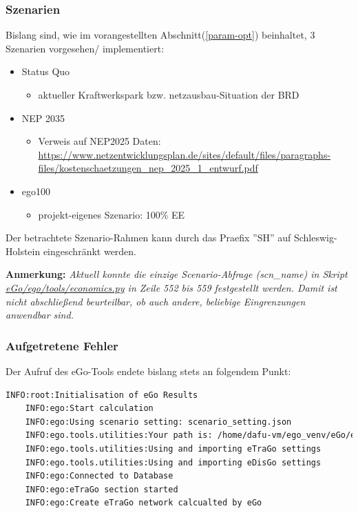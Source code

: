 \documentclass[
a4paper,     %
12pt         %
]{scrartcl}  %
\begin{document}
\subsubsection{Szenarien}
Bislang sind, wie im vorangestellten  Abschnitt(\ref{param-opt}) beinhaltet, 3 Szenarien vorgesehen/ implementiert:
\begin{itemize}
	\item Status Quo
	\begin{itemize}
		\item aktueller Kraftwerkspark bzw. netzausbau-Situation der BRD
	\end{itemize}
	\item NEP 2035
	\begin{itemize}
		\item[] Verweis auf NEP2025 Daten:
		\\\url{https://www.netzentwicklungsplan.de/sites/default/files/paragraphs-files/kostenschaetzungen_nep_2025_1_entwurf.pdf} 
	\end{itemize}
	\item ego100
	\begin{itemize}
		\item projekt-eigenes Szenario: 100\% EE
	\end{itemize}
\end{itemize}
Der betrachtete Szenario-Rahmen kann durch das Praefix ''SH'' auf Schleswig-Holstein  eingeschränkt werden. 

\textbf{Anmerkung:} \textit{Aktuell konnte die einzige Scenario-Abfrage (scn\_name) in Skript\\ \url{eGo/ego/tools/economics.py} in Zeile 552 bis 559 festgestellt werden. Damit ist nicht abschließend beurteilbar, ob auch andere, beliebige Eingrenzungen anwendbar sind.}\\



\subsubsection{Aufgetretene Fehler}
Der Aufruf des eGo-Tools endete bislang stets an folgendem Punkt:
\begin{lstlisting}[language=bash]
	INFO:root:Initialisation of eGo Results
	INFO:ego:Start calculation
	INFO:ego:Using scenario setting: scenario_setting.json
	INFO:ego.tools.utilities:Your path is: /home/dafu-vm/ego_venv/eGo/ego
	INFO:ego.tools.utilities:Using and importing eTraGo settings
	INFO:ego.tools.utilities:Using and importing eDisGo settings
	INFO:ego:Connected to Database
	INFO:ego:eTraGo section started
	INFO:ego:Create eTraGo network calcualted by eGo
\end{lstlisting}
\end{document}

